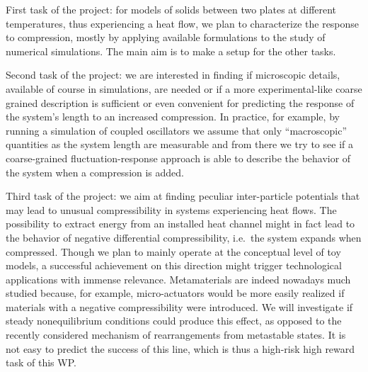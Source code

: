 \begin{workpackage}
\begin{wpdescription}
\end{wpdescription}

\begin{tasklist}

  \begin{task}[title=TASK1,id=task1,PM=15,lead=Padova,wphases=0-30!0.5]

    First task of the project: 
    for models of solids between two plates at different temperatures, 
    thus experiencing a heat flow, we plan to characterize the response to compression, mostly by applying 
    available formulations to the study of numerical simulations. The main aim is to make a setup for the
    other tasks.
    
  \end{task}

  \begin{task}[title=TASK2,id=task2,PM=15,lead=PAR2,wphases=12-42!0.5]

    Second task of the project: 
    we are interested in finding if microscopic details, available of course in simulations, 
    are needed or if a more experimental-like coarse grained description is sufficient or even convenient for
    predicting the response of the system's length to an increased compression. In practice, for example,
    by running a simulation of coupled oscillators we assume that only ``macroscopic'' quantities as the system length
    are measurable and from there we try to see if a coarse-grained fluctuation-response approach is able to
    describe the behavior of the system when a compression is added.
    
  \end{task}

  \begin{task}[title=TASK3,id=task3,PM=15,lead=Padova,wphases=0-30!0.5]

    Third task of the project: 
    we aim at finding peculiar inter-particle potentials that may lead to unusual
    compressibility in systems experiencing heat flows. The possibility to extract energy
    from an installed heat channel might in fact lead to the behavior of negative differential compressibility,
    i.e.~the system expands when compressed. 
    Though we plan to mainly operate at the conceptual level of toy
    models, a successful achievement on this direction might trigger technological applications with immense
    relevance. Metamaterials are indeed nowadays much studied because, for example, micro-actuators would be
    more easily realized if materials with a negative compressibility were introduced. We will investigate
    if steady nonequilibrium conditions could produce this effect, as opposed to the recently considered 
    mechanism of rearrangements from metastable states. It is not easy to predict the success of this line,
    which is thus a high-risk high reward task of this WP.
    

\end{task}
\end{tasklist}
\end{workpackage}
